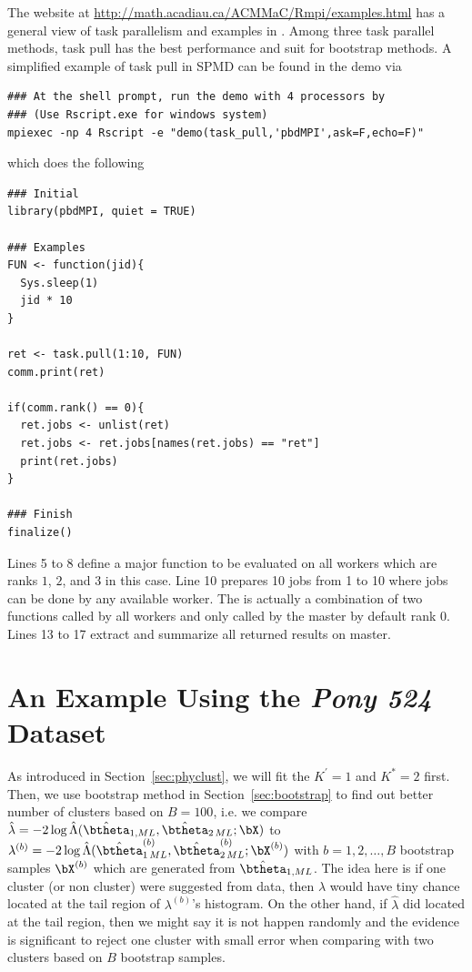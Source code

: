 The website at
\href{http://math.acadiau.ca/ACMMaC/Rmpi/examples.html}{
http://math.acadiau.ca/ACMMaC/Rmpi/examples.html}
has a general view of task parallelism and examples in .
Among three task parallel methods, task pull has the best performance and
suit for bootstrap methods.
A simplified example of task pull in SPMD can be found in the 
demo via
\begin{lstlisting}
### At the shell prompt, run the demo with 4 processors by
### (Use Rscript.exe for windows system)
mpiexec -np 4 Rscript -e "demo(task_pull,'pbdMPI',ask=F,echo=F)"
\end{lstlisting}
which does the following
\begin{lstlisting}[language=rr,title=Task Pull Example in \pkg{pbdMPI}]
### Initial
library(pbdMPI, quiet = TRUE)

### Examples
FUN <- function(jid){
  Sys.sleep(1)
  jid * 10
}

ret <- task.pull(1:10, FUN)
comm.print(ret)

if(comm.rank() == 0){
  ret.jobs <- unlist(ret)
  ret.jobs <- ret.jobs[names(ret.jobs) == "ret"]
  print(ret.jobs)
}

### Finish
finalize()
\end{lstlisting}
Lines 5 to 8 define a major function to be evaluated on all workers which are
ranks $1$, $2$, and $3$ in this case.
Line 10 prepares 10 jobs from 1 to 10 where jobs can be done by any
available worker. The  is actually a combination of two
functions  called by all workers and
 only called by the master by default rank 0.
Lines 13 to 17 extract and summarize all returned results on master.




\section{An Example Using the {\it Pony 524} Dataset}
\label{sec:ex_pony524}

As introduced in Section~\ref{sec:phyclust}, we will fit the $K^\prime = 1$ and
$K^* = 2$ first. Then, we use bootstrap method in Section~\ref{sec:bootstrap}
to find out better number of clusters based on $B = 100$,
i.e. we compare 
$\hat{\lambda} = -2\log \hat{\Lambda}
  (\hat{\btheta}_{1,ML}, \hat{\btheta}_{2\,ML}; \bX)$
to
$\lambda^{(b)} =
  -2\log \hat{\Lambda}
  (\hat{\btheta}^{(b)}_{1\,ML},
   \hat{\btheta}^{(b)}_{2\,ML}; \bX^{(b)})$
with $b = 1, 2, \ldots, B$ bootstrap samples $\bX^{(b)}$ which are generated
from $\hat{\btheta}_{1,ML}$.
The idea here is if one cluster (or non cluster) were suggested from data, then
$\hat{\lambda}$ would have tiny chance located at the tail region of
$\lambda^{(b)}$'s histogram. On the other hand, if $\hat{\lambda}$ did located
at the tail region, then we might say it is not happen randomly and the
evidence is significant to reject one cluster with small error when
comparing with two clusters based on $B$ bootstrap samples.

